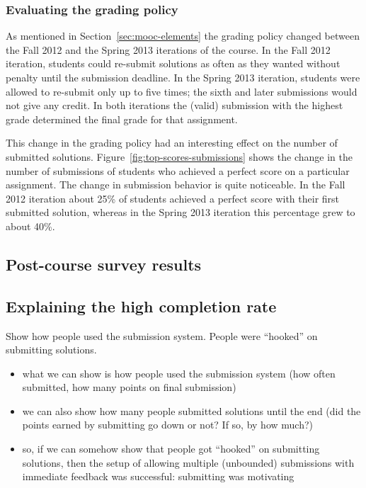 \documentclass{sig-alternate}
\begin{document}
\subsubsection{Evaluating the grading policy}\label{sec:eval-grading-policy}

As mentioned in Section~\ref{sec:mooc-elements} the grading policy changed
between the Fall 2012 and the Spring 2013 iterations of the course. In the
Fall 2012 iteration, students could re-submit solutions as often as they
wanted without penalty until the submission deadline. In the Spring 2013
iteration, students were allowed to re-submit only up to five times; the sixth
and later submissions would not give any credit. In both iterations the
(valid) submission with the highest grade determined the final grade for that
assignment.

This change in the grading policy had an interesting effect on the number of
submitted solutions. Figure~\ref{fig:top-scores-submissions} shows the change
in the number of submissions of students who achieved a perfect score on a
particular assignment. The change in submission behavior is quite noticeable.
In the Fall 2012 iteration about 25\% of students achieved a perfect score
with their first submitted solution, whereas in the Spring 2013 iteration this
percentage grew to about 40\%.

\subsection{Post-course survey results}


\subsection{Explaining the high completion rate}

Show how people used the submission system. People were ``hooked'' on submitting solutions.

\begin{itemize}

\item what we can show is how people used the submission system (how often submitted, how
  many points on final submission)

\item we can also show how many people submitted solutions until the end (did the points
  earned by submitting go down or not? If so, by how much?)

\item so, if we can somehow show that people got ``hooked'' on submitting solutions, then
  the setup of allowing multiple (unbounded) submissions with immediate feedback was
  successful: submitting was motivating

\end{itemize}
\end{document}
